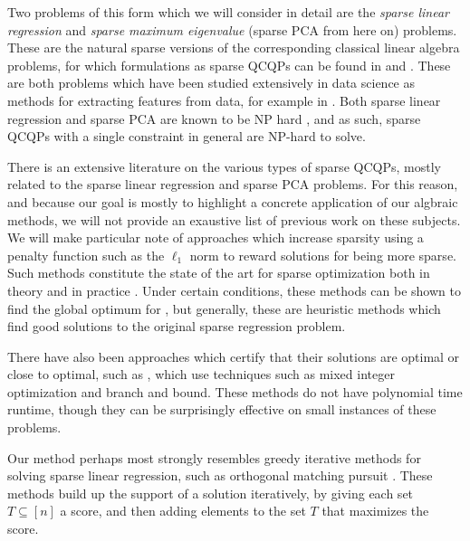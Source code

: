 \documentclass{amsart}
\theoremstyle{definition}
\begin{document}
Two problems of this form which we will consider in detail are the \emph{sparse linear regression} and \emph{sparse maximum eigenvalue} (sparse PCA from here on) problems.
These are the natural sparse versions of the corresponding classical linear algebra problems, for which formulations as sparse QCQPs can be found in  and .
These are both problems which have been studied extensively in data science as methods for extracting features from data, for example in \cite{d2008optimal,candes2005decoding}.
Both sparse linear regression and sparse PCA are known to be NP hard \cite{welch1982algorithmic, magdon2017np}, and as such, sparse QCQPs with a single constraint in general are NP-hard to solve.

There is an extensive literature on the various types of sparse QCQPs, mostly related to the sparse linear regression and sparse PCA problems.
For this reason, and because our goal is mostly to highlight a concrete application of our algbraic methods, we will not provide an exaustive list of previous work on these subjects.
We will make particular note of approaches which increase sparsity using a penalty function such as the $\ell_1$ norm to reward solutions for being more sparse.
Such methods constitute the state of the art for sparse optimization both in theory and in practice \cite{tibshirani1996regression, hastie2020best, zou2006sparse}.
Under certain conditions, these methods can be shown to find the global optimum for , but generally, these are heuristic methods which find good solutions to the original sparse regression problem.

There have also been approaches which certify that their solutions are optimal or close to optimal, such as \cite{bertsimas2016best, bertsimas2022solving}, which use techniques such as mixed integer optimization and branch and bound.
These methods do not have polynomial time runtime, though they can be surprisingly effective on small instances of these problems.

Our method perhaps most strongly resembles greedy iterative methods for solving sparse linear regression, such as orthogonal matching pursuit \cite{tropp2004greed}.
These methods build up the support of a solution iteratively, by giving each set $T \subseteq [n]$ a score, and then adding elements to the set $T$ that maximizes the score.
\end{document}
